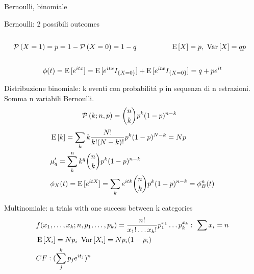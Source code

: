 \documentclass[asd-beamer.tex]{subfiles}
\begin{document}
\begin{frame}{Bernoulli, binomiale}
\begin{block}{Bernoulli: 2 possibili outcomes}
	\begin{columns}[T]
	\begin{column}{0.65\textwidth}
	\begin{align*}
	&\operatorname{\mathcal{P}}{(X=1)}=p=1-\operatorname{\mathcal{P}}{(X=0)}=1-q
	\end{align*}
	\end{column}
	\begin{column}{0.35\textwidth}
	\begin{align*}
	&\operatorname{E}{[X]}=p,\ \operatorname{Var}{[X]}=qp
	\end{align*}
	\end{column}
	\end{columns}
\[\phi(t)=\operatorname{E}{[e^{itx}]}=\operatorname{E}{[e^{itx}I_{\{X=0\}}]}+\operatorname{E}{[e^{itx}I_{\{X=0\}}]}=q+pe^{it}\]
\end{block}
\begin{block}{Distribuzione binomiale: k eventi con probabilit\'a p in sequenza di n estrazioni. Somma n variabili Bernoulli.}
\begin{align*}
&\operatorname{\mathcal{P}}{(k;n,p)}=\binom{n}{k}p^k(1-p)^{n-k}
\end{align*}
\begin{align*}
&\operatorname{E}{[k]}=\sum_kk\frac{N!}{k!(N-k)!}p^k(1-p)^{N-k}=Np\\
&\mu'_q=\sum_k^nk^q\binom{n}{k}p^k(1-p)^{n-k}\\
&\phi_X(t)=\operatorname{E}{[e^{itX}]}=\sum_ke^{itk}\binom{n}{k}p^k(1-p)^{n-k}=\phi_B^n(t)
\end{align*}
\end{block}
\end{frame}

\begin{frame}{Multinomiale: n trials with one success between k categories}
	\begin{align*}
	&f(x_1,\ldots,x_k;n,p_1,\ldots,p_k)=\frac{n!}{x_1!\ldots x_k!}p_1^{x_1}\ldots p_k^{x_k}:\ \sum x_i=n\\
	&\operatorname{E}{[X_i]}=Np_i\ \operatorname{Var}{[X_i]}=Np_i(1-p_i)\\
	&CF: (\sum_j^kp_je^{it_j})^n
	\end{align*}
\end{frame}
\end{document}
